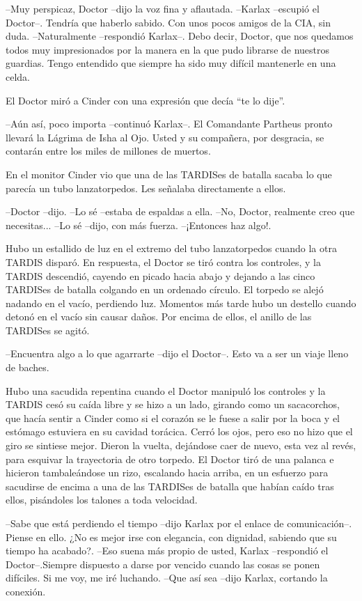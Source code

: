 --Muy perspicaz, Doctor --dijo la voz fina y aflautada.
--Karlax --escupió el Doctor--. Tendría que haberlo sabido. Con unos pocos amigos de la CIA, sin duda.
--Naturalmente --respondió Karlax--. Debo decir, Doctor, que nos quedamos todos muy impresionados por la manera en la que pudo librarse de nuestros guardias. Tengo entendido que siempre ha sido muy difícil mantenerle en una celda.

El Doctor miró a Cinder con una expresión que decía ``te lo dije''.

--Aún así, poco importa --continuó Karlax--. El Comandante Partheus pronto llevará la Lágrima de Isha al Ojo. Usted y su compañera, por desgracia, se contarán entre los miles de millones de muertos.

En el monitor Cinder vio que una de las TARDISes de batalla sacaba lo que parecía un tubo lanzatorpedos. Les señalaba directamente a ellos. 

--Doctor --dijo.
--Lo sé --estaba de espaldas a ella.
--No, Doctor, realmente creo que necesitas...
--Lo sé --dijo, con más fuerza.
--¡Entonces haz algo!.

Hubo un estallido de luz en el extremo del tubo lanzatorpedos cuando la otra TARDIS disparó. En respuesta, el Doctor se tiró contra los controles, y la TARDIS descendió, cayendo en picado hacia abajo y dejando a las cinco TARDISes de batalla colgando en un ordenado círculo.
El torpedo se alejó nadando en el vacío, perdiendo luz. Momentos más tarde hubo un destello cuando detonó en el vacío sin causar daños. Por encima de ellos, el anillo de las TARDISes se agitó.

--Encuentra algo a lo que agarrarte --dijo el Doctor--. Esto va a ser un viaje lleno de baches.

Hubo una sacudida repentina cuando el Doctor manipuló los controles y la TARDIS cesó su caída libre y se hizo a un lado, girando como un sacacorchos, que hacía sentir a Cinder como si el corazón se le fuese a salir por la boca y el estómago estuviera en su cavidad torácica. Cerró los ojos, pero eso no hizo que el giro se sintiese mejor.
Dieron la vuelta, dejándose caer de nuevo, esta vez al revés, para esquivar la trayectoria de otro torpedo. El Doctor tiró de una palanca e hicieron tambaleándose un rizo, escalando hacia arriba, en un esfuerzo para sacudirse de encima a una de las TARDISes de batalla que habían caído tras ellos, pisándoles los talones a toda velocidad.

--Sabe que está perdiendo el tiempo --dijo Karlax por el enlace de comunicación--. Piense en ello. ¿No es mejor irse con elegancia, con dignidad, sabiendo que su tiempo ha acabado?.
--Eso suena más propio de usted, Karlax --respondió el Doctor--.Siempre dispuesto a darse por vencido cuando las cosas se ponen difíciles. Si me voy, me iré luchando.
--Que así sea --dijo Karlax, cortando la conexión.

